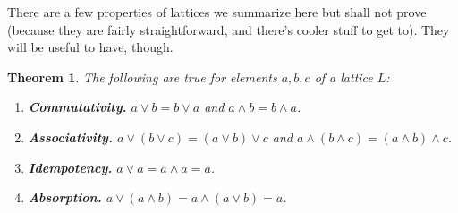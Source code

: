 \documentclass[10pt, letterpaper]{article}
\newtheorem{theorem}{Theorem}
\theoremstyle{definition}
\begin{document}
There are a few properties of lattices we summarize here but shall not prove
(because they are fairly straightforward, and there's cooler stuff to get to).
They will be useful to have, though.

\begin{theorem}\label{lattice_props}
	The following are true for elements \(a,b,c\) of a lattice \(L\):
	\begin{enumerate}
		\item\textbf{Commutativity.} \(a\vee b=b\vee a\) and \( a\wedge b=b\wedge a\).
		\item\textbf{Associativity.} \(a\vee(b\vee c)=(a\vee b)\vee c\) and 
			\(a\wedge(b\wedge c)=(a\wedge b)\wedge c\).
		\item\textbf{Idempotency.} \(a\vee a=a\wedge a=a\).
		\item\textbf{Absorption.} \(a\vee(a\wedge b)=a\wedge(a\vee b)=a\).
	\end{enumerate}
\end{theorem}
\end{document}
